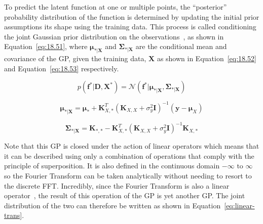 \documentclass[12pt]{article}
\begin{document}
    To predict the latent function at one or multiple points, the ``posterior'' probability distribution of the function is determined by updating the initial prior assumptions its shape using the training data.
    This process is called conditioning the joint Gaussian prior distribution on the observations~\cite{rasmussen2006gaussian}, as shown in Equation~\ref{eq:18.51}, where $\boldsymbol{\mu}_{*\vert \mathbf{X}}$ and $\boldsymbol{\Sigma}_{*\vert \mathbf{X}}$ are the conditional mean and covariance of the GP, given the training data, $\mathbf{X}$ as shown in Equation~\ref{eq:18.52} and Equation~\ref{eq:18.53} respectively.

    \begin{equation}
        p(\mathbf{f}^* \vert \mathbf{D}, \mathbf{X}^*) = \mathcal{N}(\mathbf{f}^* \vert \boldsymbol{\mu}_{*\vert \mathbf{X}}, \boldsymbol{\Sigma}_{*\vert \mathbf{X}})\label{eq:18.51}
    \end{equation}

    \begin{equation}
        \boldsymbol{\mu}_{*\vert \mathbf{X}} = \boldsymbol{\mu}_* + \mathbf{K}_{X,*}^T (\mathbf{K}_{X,X} + \sigma^2_y \mathbf{I})^{-1} (\mathbf{y} - \boldsymbol{\mu}_X)\label{eq:18.52}
    \end{equation}

    \begin{equation}
        \boldsymbol{\Sigma}_{*\vert \mathbf{X}} = \mathbf{K}_{*,*} - \mathbf{K}_{X,*}^T (\mathbf{K}_{X,X} + \sigma^2_y \mathbf{I})^{-1} \mathbf{K}_{X,*}\label{eq:18.53}
    \end{equation}


    Note that this GP is closed under the action of linear operators which means that it can be described using only a combination of operations that comply with the principle of superposition.
    It is also defined in the continuous domain $-\infty \text{ to } \infty$ so the Fourier Transform can be taken analytically without needing to resort to the discrete FFT\@.
    Incredibly, since the Fourier Transform is also a linear operator~\cite{Jidling2017}, the result of this operation of the GP is yet another GP. The joint distribution of the two can therefore be written as shown in Equation~\ref{eq:linear-trans}.
\end{document}
